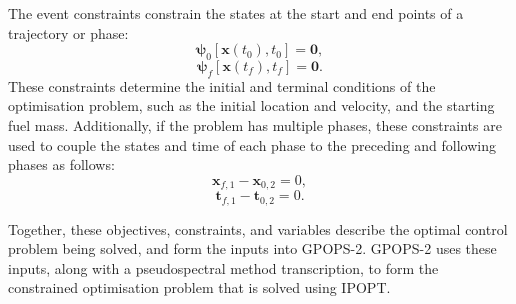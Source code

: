 \noindent The event constraints constrain the states at the start and end points of a trajectory or phase:
\begin{equation}
\mathbf{\psi}_0[\textbf{x}(t_{0}), t_{0}] = \textbf{0},
\end{equation}
\begin{equation} \label{eq:2}
\mathbf{\psi}_f[\textbf{x}(t_{f}), t_{f}] = \textbf{0}.
\end{equation}
These constraints determine the initial and terminal conditions of the optimisation problem, such as the initial location and velocity, and the starting fuel mass. Additionally, if the problem has multiple phases, these constraints are used to couple the states and time of each phase to the preceding and following phases as follows:
\begin{equation}
\textbf{x}_{f,1} - \textbf{x}_{0,2} = 0,
\end{equation}
\begin{equation}
\textbf{t}_{f,1} - \textbf{t}_{0,2} = 0.
\end{equation}






Together, these objectives, constraints, and variables describe the optimal control problem being solved, and form the inputs into GPOPS-2. GPOPS-2 uses these inputs, along with a pseudospectral method transcription, to form the constrained optimisation problem that is solved using IPOPT.










